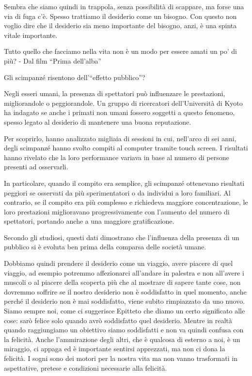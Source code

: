 \documentclass[12pt]{book} %
\begin{document}
Sembra che siamo quindi in trappola, senza possibilità di scappare, ma forse una via di fuga c'è.
Spesso trattiamo il desiderio come un bisogno. Con questo non voglio dire che il desiderio sia meno importante del
bisogno, anzi, è una spinta vitale importante.

Tutto quello che facciamo nella vita non è un modo per essere amati un po' di più? - Dal film “Prima dell'alba”

\begin{mdframed}[linewidth=1pt]
Gli scimpanzé risentono dell’“effetto pubblico”?

Negli esseri umani, la presenza di spettatori può influenzare le prestazioni, migliorandole o peggiorandole. Un gruppo di ricercatori dell’Università di Kyoto ha indagato se anche i primati non umani fossero soggetti a questo fenomeno, spesso legato al desiderio di mantenere una buona reputazione.

Per scoprirlo, hanno analizzato migliaia di sessioni in cui, nell’arco di sei anni, degli scimpanzé hanno svolto compiti al computer tramite touch screen. I risultati hanno rivelato che la loro performance variava in base al numero di persone presenti ad osservarli.

In particolare, quando il compito era semplice, gli scimpanzé ottenevano risultati peggiori se osservati da più sperimentatori o da individui a loro familiari. Al contrario, se il compito era più complesso e richiedeva maggiore concentrazione, le loro prestazioni miglioravano progressivamente con l’aumento del numero di spettatori, portando anche a una maggiore gratificazione.

Secondo gli studiosi, questi dati dimostrano che l’influenza della presenza di un pubblico si è evoluta ben prima della comparsa delle società umane.
\end{mdframed}

Dobbiamo quindi prendere il desiderio come un viaggio, avere piacere di quel viaggio, ad esempio potremmo affezionarci
all'andare in palestra e non all'avere i muscoli o al piacere della scoperta più che al mostrare di
sapere tante cose, non dovremmo soffrire se il nostro desiderio non è soddisfatto in quel momento, anche perché il
desiderio non è mai soddisfatto, viene subito rimpiazzato da uno nuovo. Siamo sempre noi, come ci suggerisce Epitteto
che diamo un certo significato alle cose: sarò felice solo quando avrò soddisfatto quel desiderio. Mentre in realtà
quando raggiungiamo un obiettivo siamo soddisfatti e non va quindi confusa con la felicità. Anche
l'ammirazione degli altri, che è qualcosa di esterno a noi, è un miraggio, ci appaga ed è
importante sentirsi apprezzati, ma non ci dona la felicità. I sogni sono dei motori per la nostra vita ma non vanno
trasformati in aspettative, pretese e condizioni necessarie alla felicità.
\end{document}
